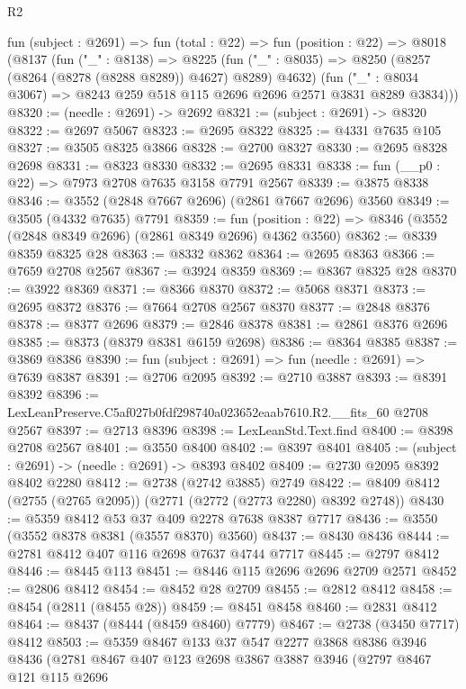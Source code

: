\begin{lexlean}{R2}
\begin{coremodule}
  fun (subject : @2691) =>
  fun (total : @22) =>
  fun (position : @22) =>
  @8018
    (@8137
      (fun ("_" : @8138) =>
      @8225
        (fun ("_" : @8035) => @8250 (@8257 (@8264 (@8278 (@8288 @8289)) @4627) @8289) @4632)
        (fun ("_" : @8034 @3067) => @8243 @259 @518 @115 @2696 @2696 @2571 @3831 @8289 @3834)))
@8320 := (needle : @2691) -> @2692
@8321 := (subject : @2691) -> @8320
@8322 := @2697 @5067
@8323 := @2695 @8322
@8325 := @4331 @7635 @105
@8327 := @3505 @8325 @3866
@8328 := @2700 @8327
@8330 := @2695 @8328 @2698
@8331 := @8323 @8330
@8332 := @2695 @8331
@8338 := fun (__p0 : @22) => @7973 @2708 @7635 @3158 @7791 @2567
@8339 := @3875 @8338
@8346 := @3552 (@2848 @7667 @2696) (@2861 @7667 @2696) @3560
@8349 := @3505 (@4332 @7635) @7791
@8359 := fun (position : @22) => @8346 (@3552 (@2848 @8349 @2696) (@2861 @8349 @2696) @4362 @3560)
@8362 := @8339 @8359 @8325 @28
@8363 := @8332 @8362
@8364 := @2695 @8363
@8366 := @7659 @2708 @2567
@8367 := @3924 @8359
@8369 := @8367 @8325 @28
@8370 := @3922 @8369
@8371 := @8366 @8370
@8372 := @5068 @8371
@8373 := @2695 @8372
@8376 := @7664 @2708 @2567 @8370
@8377 := @2848 @8376
@8378 := @8377 @2696
@8379 := @2846 @8378
@8381 := @2861 @8376 @2696
@8385 := @8373 (@8379 @8381 @6159 @2698)
@8386 := @8364 @8385
@8387 := @3869 @8386
@8390 := fun (subject : @2691) => fun (needle : @2691) => @7639 @8387
@8391 := @2706 @2095
@8392 := @2710 @3887
@8393 := @8391 @8392
@8396 := LexLeanPreserve.C5af027b0fdf298740a023652eaab7610.R2.__fits_60 @2708 @2567
@8397 := @2713 @8396
@8398 := LexLeanStd.Text.find
@8400 := @8398 @2708 @2567
@8401 := @3550 @8400
@8402 := @8397 @8401
@8405 := (subject : @2691) -> (needle : @2691) -> @8393 @8402
@8409 := @2730 @2095 @8392 @8402 @2280
@8412 := @2738 (@2742 @3885) @2749
@8422 := @8409 @8412 (@2755 (@2765 @2095)) (@2771 (@2772 (@2773 @2280) @8392 @2748))
@8430 := @5359 @8412 @53 @37 @409 @2278 @7638 @8387 @7717
@8436 := @3550 (@3552 @8378 @8381 (@3557 @8370) @3560)
@8437 := @8430 @8436
@8444 := @2781 @8412 @407 @116 @2698 @7637 @4744 @7717
@8445 := @2797 @8412
@8446 := @8445 @113
@8451 := @8446 @115 @2696 @2696 @2709 @2571
@8452 := @2806 @8412
@8454 := @8452 @28 @2709
@8455 := @2812 @8412
@8458 := @8454 (@2811 (@8455 @28))
@8459 := @8451 @8458
@8460 := @2831 @8412
@8464 := @8437 (@8444 (@8459 @8460) @7779)
@8467 := @2738 (@3450 @7717) @8412
@8503 := @5359
    @8467
    @133
    @37
    @547
    @2277
    @3868
    @8386
    @3946
    @8436
    (@2781
      @8467
      @407
      @123
      @2698
      @3867
      @3887
      @3946
      (@2797
        @8467
        @121
        @115
        @2696

\end{coremodule}
\end{lexlean}

